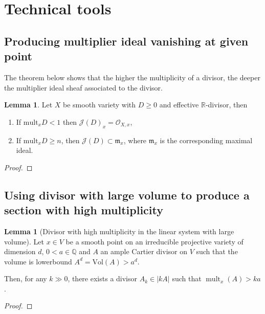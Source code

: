 \documentclass[11pt]{article}
\theoremstyle{definition}
\newtheorem{lemma}[theorem]{Lemma}
\begin{document}
	
	\section{Technical tools}
	\subsection{Producing multiplier ideal vanishing at given point}
	The theorem below shows that the higher the multiplicity of a divisor, the deeper the multiplier ideal sheaf associated to the divisor.
	\begin{lemma}
		Let $X$ be smooth variety with $D\ge 0$ and effective $\mathbb{R}$-divisor, then 
		
		\begin{enumerate}
			\item If $\text{mult}_x D<1$ then $\mathcal{J}(D)_x = \mathcal{O}_{X,x}$,
			\item If $\text{mult}_x D \geq n$, then $\mathcal{J}(D) \subset \mathfrak{m}_x$, where $\mathfrak{m}_x$ is the corresponding maximal ideal.
		\end{enumerate}
	\end{lemma}
	\begin{proof}
		
	\end{proof}
	\subsection{Using divisor with large volume to produce a section with high multiplicity}
	\begin{lemma}[Divisor with high multiplicity in the linear system with large volume]\label{highmulti}
		Let $x \in V$ be a smooth point on an irreducible projective variety of dimension $d$, $0<a \in \mathbb{Q}$ and $A$ an ample Cartier divisor on $V$ such that the volume is lowerbound $A^d = \text{Vol}(A)>a^d$. 
		
		Then, for any $k \gg 0$, there exists a divisor $A_k \in|k A|$ such that $\operatorname{mult}_x(A)>k a$.
	\end{lemma}
	\begin{proof}
		
	\end{proof}
\end{document}
